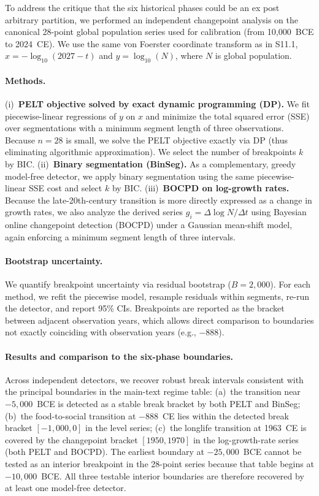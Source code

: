\documentclass[11pt]{article}
\begin{document}
To address the critique that the six historical phases could be an ex post arbitrary partition,
we performed an independent changepoint analysis on the canonical 28-point global population series
used for calibration (from 10,000~BCE to 2024~CE).
We use the same von Foerster coordinate transform as in S11.1,
$x=-\log_{10}(2027-t)$ and $y=\log_{10}(N)$, where $N$ is global population.

\paragraph{Methods.}
(i)~\textbf{PELT objective solved by exact dynamic programming (DP).}
We fit piecewise-linear regressions of $y$ on $x$ and minimize the total squared error (SSE)
over segmentations with a minimum segment length of three observations.  Because $n=28$ is small,
we solve the PELT objective exactly via DP (thus eliminating algorithmic approximation).
We select the number of breakpoints $k$ by BIC.
(ii)~\textbf{Binary segmentation (BinSeg).}
As a complementary, greedy model-free detector, we apply binary segmentation using the same
piecewise-linear SSE cost and select $k$ by BIC.
(iii)~\textbf{BOCPD on log-growth rates.}
Because the late-20th-century transition is more directly expressed as a change in growth rates,
we also analyze the derived series $g_i=\Delta\log N/\Delta t$ using Bayesian online changepoint detection
(BOCPD) under a Gaussian mean-shift model, again enforcing a minimum segment length of three intervals.

\paragraph{Bootstrap uncertainty.}
We quantify breakpoint uncertainty via residual bootstrap ($B=2{,}000$).  For each method, we refit the
piecewise model, resample residuals within segments, re-run the detector, and report 95\% CIs.
Breakpoints are reported as the bracket between adjacent observation years, which allows direct comparison
to boundaries not exactly coinciding with observation years (e.g., $-888$).

\paragraph{Results and comparison to the six-phase boundaries.}
Across independent detectors, we recover robust break intervals consistent with the principal boundaries
in the main-text regime table:
(a)~the transition near $-5{,}000$~BCE is detected as a stable break bracket by both PELT and BinSeg;
(b)~the food-to-social transition at $-888$~CE lies within the detected break bracket $[-1{,}000, 0]$ in the level series;
(c)~the longlife transition at 1963~CE is covered by the changepoint bracket $[1950, 1970]$ in the log-growth-rate series (both PELT and BOCPD).
The earliest boundary at $-25{,}000$~BCE cannot be tested as an interior breakpoint in the 28-point series because that table begins at $-10{,}000$~BCE.
All three testable interior boundaries are therefore recovered by at least one model-free detector.
\end{document}

